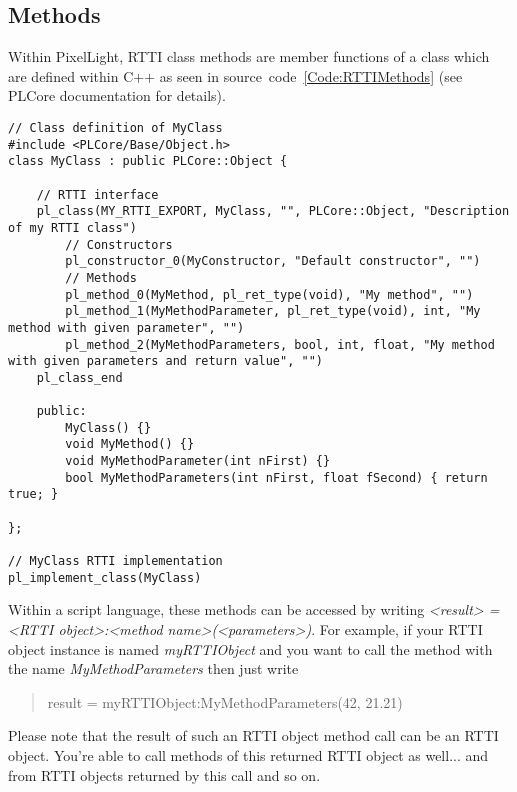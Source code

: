 \subsection{Methods}
Within PixelLight, RTTI class methods are member functions of a class which are defined within C++ as seen in source~code~\ref{Code:RTTIMethods} (see PLCore documentation for details).
\begin{lstlisting}[label=Code:RTTIMethods,caption={Definition of RTTI class methods with parameters (C++)}]
// Class definition of MyClass
#include <PLCore/Base/Object.h>
class MyClass : public PLCore::Object {

	// RTTI interface
	pl_class(MY_RTTI_EXPORT, MyClass, "", PLCore::Object, "Description of my RTTI class")
		// Constructors
		pl_constructor_0(MyConstructor, "Default constructor", "")
		// Methods
		pl_method_0(MyMethod, pl_ret_type(void), "My method", "")
		pl_method_1(MyMethodParameter, pl_ret_type(void), int, "My method with given parameter", "")
		pl_method_2(MyMethodParameters, bool, int, float, "My method with given parameters and return value", "")
	pl_class_end

	public:
		MyClass() {}
		void MyMethod() {}
		void MyMethodParameter(int nFirst) {}
		bool MyMethodParameters(int nFirst, float fSecond) { return true; }

};

// MyClass RTTI implementation
pl_implement_class(MyClass)
\end{lstlisting}

Within a script language, these methods can be accessed by writing \emph{<result> = <RTTI object>:<method name>(<parameters>)}. For example, if your RTTI object instance is named \emph{myRTTIObject} and you want to call the method with the name \emph{MyMethodParameters} then just write \begin{quote}result = myRTTIObject:MyMethodParameters(42, 21.21)\end{quote}

Please note that the result of such an RTTI object method call can be an RTTI object. You're able to call methods of this returned RTTI object as well... and from RTTI objects returned by this call and so on.


